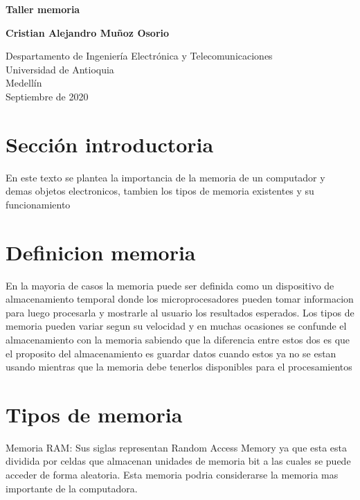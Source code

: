 \documentclass{article}
\begin{document}
\begin{titlepage}
    \begin{center}
        \vspace*{1cm}
            
        \Huge
        \textbf{Taller memoria}
            
        \vspace{0.5cm}
        \LARGE

            
        \vspace{1.5cm}
            
        \textbf{Cristian Alejandro Muñoz Osorio}
            
        \vfill
            
        \vspace{0.8cm}
            
        \Large
        Despartamento de Ingeniería Electrónica y Telecomunicaciones\\
        Universidad de Antioquia\\
        Medellín\\
        Septiembre de 2020
            
    \end{center}
\end{titlepage}

\tableofcontents

\section{Sección introductoria}
En este texto se plantea la importancia de la memoria de un computador y demas objetos electronicos, tambien los tipos de memoria existentes y su funcionamiento

\section{Definicion memoria}
En la mayoria de casos la memoria puede ser definida como un dispositivo de almacenamiento temporal donde los microprocesadores pueden tomar informacion para luego procesarla y mostrarle al usuario los resultados esperados. Los tipos de memoria pueden variar segun su velocidad y en muchas ocasiones se confunde el almacenamiento con la memoria sabiendo que la diferencia entre estos dos es que el proposito del almacenamiento es guardar datos cuando estos ya no se estan usando mientras que la memoria debe tenerlos disponibles para el procesamientos

\section{Tipos de memoria}
Memoria RAM: Sus siglas representan Random Access Memory ya que esta esta dividida por celdas que almacenan unidades de memoria bit a las cuales se puede acceder de forma aleatoria. Esta memoria podria considerarse la memoria mas importante de la computadora.
\end{document}
